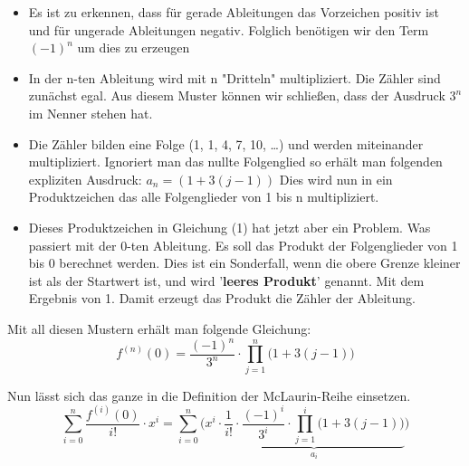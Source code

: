 \documentclass[18pt,a4paper]{article}
\begin{document}
\begin{itemize}
	\item Es ist zu erkennen, dass für gerade Ableitungen das Vorzeichen positiv ist und für ungerade Ableitungen negativ. Folglich benötigen wir den Term $(-1)^n$ um dies zu erzeugen
	\item In der n-ten Ableitung wird mit n "Dritteln" multipliziert. Die Zähler sind zunächst egal. Aus diesem Muster können wir schließen, dass der Ausdruck $3^n$ im Nenner stehen hat.
	\item Die Zähler bilden eine Folge (1, 1, 4, 7, 10, \dots) und werden miteinander multipliziert. Ignoriert man das nullte Folgenglied so erhält man folgenden expliziten Ausdruck: $a_n = (1+3(j-1))$ Dies wird nun in ein Produktzeichen das alle Folgenglieder von 1 bis n multipliziert.
	\item Dieses Produktzeichen in Gleichung (1) hat jetzt aber ein Problem. Was passiert mit der 0-ten Ableitung. Es soll das Produkt der Folgenglieder von 1 bis 0 berechnet werden. Dies ist ein Sonderfall, wenn die obere Grenze kleiner ist als der Startwert ist, und wird '\textbf{leeres Produkt}' genannt. Mit dem Ergebnis von 1. Damit erzeugt das Produkt die Zähler der Ableitung.
\end{itemize}
Mit all diesen Mustern erhält man folgende Gleichung:
\begin{equation}
f^{(n)}(0)= \frac{(-1)^n}{3^n}\cdot\prod_{j=1}^{n}\Big(1+3(j-1)\Big)
\end{equation}
\begin{comment}
Das allgemeine Produkt sieht etwas hässlich und ungewohnt aus. Die erste Frage die man bei sich bei genauerem beobachten stellt. Was zum Fick soll das Produkt von 1 bis n sein, für n=0. Das ist ein Sonderfall des Produktes. Ist die obere Grenze größer als der Startwert des Iterators i, so nennt der Mathematiker dies 'leeres Produkt' und dieses wurde definiert mit dem Ergebnis 1. (eine hässliche Googlesuche hat das ergeben). Im Produkt selbst wird nun die oben erwähnte Folge eingesetzt. Der Iterator wird deswegen um 1 nach hinten verschoben\\
\end{comment}
Nun lässt sich das ganze in die Definition der McLaurin-Reihe einsetzen.
\begin{equation*}
\sum_{i=0}^{n}\frac{f^{(i)}(0)}{i!}\cdot x^i = \sum_{i=0}^{n}\bigg(x^i \cdot \underbrace{ \frac{1}{i!} \cdot \frac{(-1)^i}{3^i}\cdot\prod_{j=1}^{i}\Big(1+3(j-1)\Big)}_\text{$a_i$} \bigg)
\end{equation*}
\end{document}
